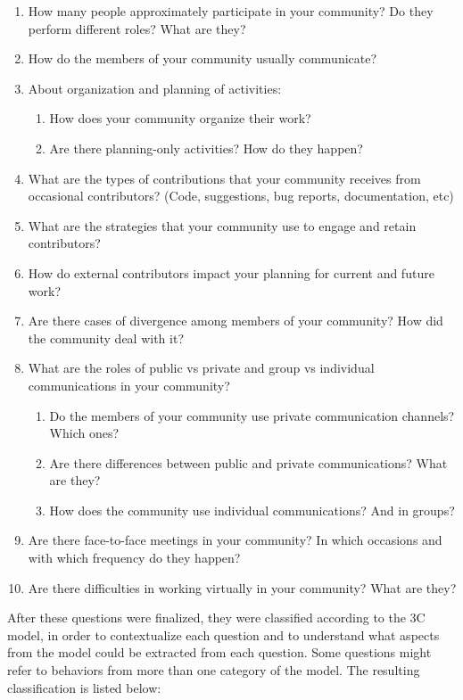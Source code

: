 \documentclass{sigchi}
\begin{document}
\begin{enumerate}
  \item How many people approximately participate in your community? Do they perform different roles? What are they?
  \item How do the members of your community usually communicate?
  \item About organization and planning of activities:
  \begin{enumerate}
    \item How does your community organize their work?
    \item Are there planning-only activities? How do they happen?
  \end{enumerate}
  \item What are the types of contributions that your community receives from occasional contributors? (Code, suggestions, bug reports, documentation, etc)
  \item What are the strategies that your community use to engage and retain contributors?
  \item How do external contributors impact your planning for current and future work?
  \item Are there cases of divergence among members of your community? How did the community deal with it?
  \item What are the roles of public vs private and group vs individual communications in your community?
  \begin{enumerate}
    \item Do the members of your community use private communication channels? Which ones?
    \item Are there differences between public and private communications? What are they?
    \item How does the community use individual communications? And in groups?
  \end{enumerate}
  \item Are there face-to-face meetings in your community? In which occasions and with which frequency do they happen?
  \item Are there difficulties in working virtually in your community? What are they?
\end{enumerate}

After these questions were finalized, they were classified according to the 3C model, in order to contextualize each question and to understand what aspects from the model could be extracted from each question. Some questions might refer to behaviors from more than one category of the model. The resulting classification is listed below:
\end{document}
